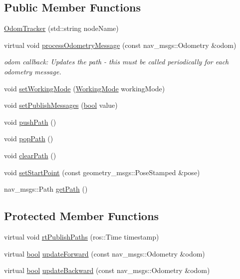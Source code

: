 \subsection*{Public Member Functions}
\begin{DoxyCompactItemize}
\item 
\hyperlink{classodom__tracker_1_1OdomTracker_a640fad3cd94d47fab607286897fae438}{Odom\+Tracker} (std\+::string node\+Name)
\item 
virtual void \hyperlink{classodom__tracker_1_1OdomTracker_a90cf5e7b0de712b88e86966c29ab79ef}{process\+Odometry\+Message} (const nav\+\_\+msgs\+::\+Odometry \&odom)
\begin{DoxyCompactList}\small\item\em odom callback\+: Updates the path -\/ this must be called periodically for each odometry message. \end{DoxyCompactList}\item 
void \hyperlink{classodom__tracker_1_1OdomTracker_ac001a40d1107ef0d88aa7db03cafb08c}{set\+Working\+Mode} (\hyperlink{namespaceodom__tracker_a4daf27fd157b1a481fdfd6f90de00b88}{Working\+Mode} working\+Mode)
\item 
void \hyperlink{classodom__tracker_1_1OdomTracker_abcfb8d68a75223ff1daba4930f4f7034}{set\+Publish\+Messages} (\hyperlink{classbool}{bool} value)
\item 
void \hyperlink{classodom__tracker_1_1OdomTracker_ad25596446295049cf67a6564aad0dfa0}{push\+Path} ()
\item 
void \hyperlink{classodom__tracker_1_1OdomTracker_aaba0160e172d1bb7989605852f19c658}{pop\+Path} ()
\item 
void \hyperlink{classodom__tracker_1_1OdomTracker_a03c47908606d48e20b3b7e7b583b341d}{clear\+Path} ()
\item 
void \hyperlink{classodom__tracker_1_1OdomTracker_ac927dff2231f73384e54d114d56e61e3}{set\+Start\+Point} (const geometry\+\_\+msgs\+::\+Pose\+Stamped \&pose)
\item 
nav\+\_\+msgs\+::\+Path \hyperlink{classodom__tracker_1_1OdomTracker_a33cb7ab3947b27bf61fabb5be2dd87c9}{get\+Path} ()
\end{DoxyCompactItemize}
\subsection*{Protected Member Functions}
\begin{DoxyCompactItemize}
\item 
virtual void \hyperlink{classodom__tracker_1_1OdomTracker_ade06ab05e1853fbccd3702f88f0a42e5}{rt\+Publish\+Paths} (ros\+::\+Time timestamp)
\item 
virtual \hyperlink{classbool}{bool} \hyperlink{classodom__tracker_1_1OdomTracker_a248c89552c36c6df65a0d3b9aa58cce6}{update\+Forward} (const nav\+\_\+msgs\+::\+Odometry \&odom)
\item 
virtual \hyperlink{classbool}{bool} \hyperlink{classodom__tracker_1_1OdomTracker_a30bb3d4a44600ce951a6be4f6583466c}{update\+Backward} (const nav\+\_\+msgs\+::\+Odometry \&odom)
\end{DoxyCompactItemize}
